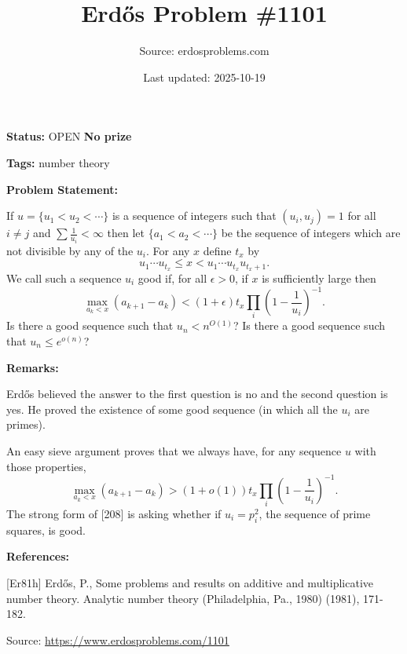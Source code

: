 \documentclass{article}
\title{Erd\H{o}s Problem \#1101}
\date{Last updated: 2025-10-19}
\author{Source: erdosproblems.com}
\begin{document}
\maketitle

\noindent\textbf{Status:} OPEN \quad \textbf{No prize}

\noindent\textbf{Tags:} number theory

\medskip
\noindent\textbf{Problem Statement:}

If $u=\{u_1<u_2<\cdots\}$ is a sequence of integers such that $(u_i,u_j)=1$ for all $i\neq j$ and $\sum \frac{1}{u_i}<\infty$ then let $\{a_1<a_2<\cdots\}$ be the sequence of integers which are not divisible by any of the $u_i$. For any $x$ define $t_x$ by\[u_1\cdots u_{t_x}\leq x< u_1\cdots u_{t_x}u_{t_x+1}.\]We call such a sequence $u_i$ good if, for all $\epsilon>0$, if $x$ is sufficiently large then\[\max_{a_k<x} (a_{k+1}-a_k) < (1+\epsilon)t_x \prod_{i}\left(1-\frac{1}{u_i}\right)^{-1}.\]Is there a good sequence such that $u_n< n^{O(1)}$? Is there a good sequence such that $u_n\leq e^{o(n)}$?

\bigskip
\noindent\textbf{Remarks:}

Erd\H{o}s \cite{Er81h} believed the answer to the first question is no and the second question is yes. He proved the existence of some good sequence (in which all the $u_i$ are primes).

An easy sieve argument proves that we always have, for any sequence $u$ with those properties,\[\max_{a_k<x} (a_{k+1}-a_k)> (1+o(1))t_x \prod_{i}\left(1-\frac{1}{u_i}\right)^{-1}.\]The strong form of [208] is asking whether if $u_i=p_i^2$, the sequence of prime squares, is good.

\bigskip
\noindent\textbf{References:}

[Er81h] Erd\H{o}s, P., Some problems and results on additive and multiplicative
number theory. Analytic number theory (Philadelphia, Pa., 1980) (1981), 171-182.

\bigskip
\noindent\small{Source: \url{https://www.erdosproblems.com/1101}}
\end{document}
